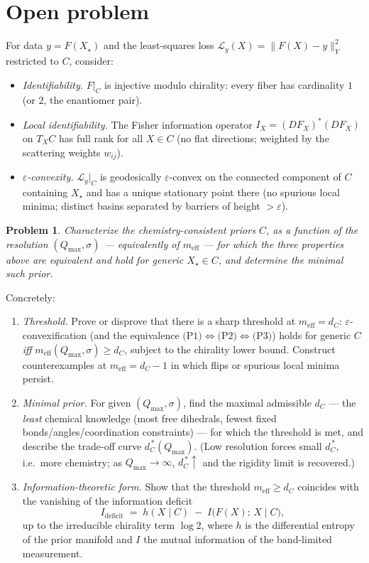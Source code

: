 \documentclass[11pt]{article}
\newtheorem{problem}{Problem}
\begin{document}
\section*{Open problem}

For data $y=F(X_\star)$ and the least-squares loss
$\mathcal{L}_y(X)=\|F(X)-y\|_Y^2$ restricted to $C$, consider:
\begin{itemize}
\item[\textbf{(P1)}] \emph{Identifiability.} $F|_C$ is injective modulo
chirality: every fiber has cardinality $1$ (or $2$, the enantiomer pair).
\item[\textbf{(P2)}] \emph{Local identifiability.} The Fisher information
operator $I_X=(DF_X)^{*}(DF_X)$ on $T_X C$ has full rank for all $X\in C$
(no flat directions; weighted by the scattering weights $w_{ij}$).
\item[\textbf{(P3)}] \emph{$\varepsilon$-convexity.} $\mathcal{L}_y|_C$ is
geodesically $\varepsilon$-convex on the connected component of $C$
containing $X_\star$ and has a unique stationary point there (no spurious
local minima; distinct basins separated by barriers of height $>\varepsilon$).
\end{itemize}

\begin{problem}
Characterize the chemistry-consistent priors $C$, as a function of the
resolution $(Q_{\max},\sigma)$ --- equivalently of $m_{\mathrm{eff}}$ ---
for which the three properties above are equivalent and hold for generic
$X_\star\in C$, and determine the \emph{minimal} such prior.
\end{problem}

Concretely:
\begin{enumerate}
\item[\textbf{(a)}] \emph{Threshold.} Prove or disprove that there is a sharp
threshold at $m_{\mathrm{eff}}=d_C$: $\varepsilon$-convexification (and the
equivalence $\text{(P1)}\!\Leftrightarrow\!\text{(P2)}\!\Leftrightarrow\!\text{(P3)}$)
holds for generic $C$ \emph{iff} $m_{\mathrm{eff}}(Q_{\max},\sigma)\ge d_C$,
subject to the chirality lower bound. Construct counterexamples at
$m_{\mathrm{eff}}=d_C-1$ in which flips or spurious local minima persist.
\item[\textbf{(b)}] \emph{Minimal prior.} For given $(Q_{\max},\sigma)$, find
the maximal admissible $d_C$ --- the \emph{least} chemical knowledge (most
free dihedrals, fewest fixed bonds/angles/coordination constraints) --- for
which the threshold is met, and describe the trade-off curve
$d_C^{\,*}(Q_{\max})$. (Low resolution forces small $d_C^{\,*}$, i.e.\ more
chemistry; as $Q_{\max}\to\infty$, $d_C^{\,*}\uparrow$ and the rigidity limit
is recovered.)
\item[\textbf{(c)}] \emph{Information-theoretic form.} Show that the
threshold $m_{\mathrm{eff}}\ge d_C$ coincides with the vanishing of the
information deficit
\[
  I_{\mathrm{deficit}}
  \;=\; h(X\mid C) \;-\; I\!\bigl(F(X);\,X\mid C\bigr),
\]
up to the irreducible chirality term $\log 2$, where $h$ is the differential
entropy of the prior manifold and $I$ the mutual information of the
band-limited measurement.
\end{enumerate}
\end{document}
